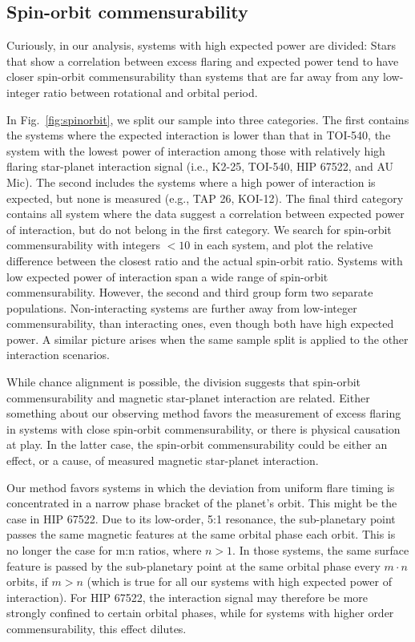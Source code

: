 \documentclass[twocolumn]{aastex631}
\begin{document}
\subsection{Spin-orbit commensurability}
\label{sec:discussion:commensurability}
Curiously, in our analysis, systems with high expected power are divided: Stars that show a correlation between excess flaring and expected power tend to have closer spin-orbit commensurability than systems that are far away from any low-integer ratio between rotational and orbital period.

In Fig.~\ref{fig:spinorbit}, we split our sample into three categories. The first contains the systems where the expected interaction is lower than that in TOI-540, the system with the lowest power of interaction among those with relatively high flaring star-planet interaction signal (i.e., K2-25, TOI-540, HIP 67522, and AU Mic). The second includes the systems where a high power of interaction is expected, but none is measured (e.g., TAP 26, KOI-12). The final third category contains all system where the data suggest a correlation between expected power of interaction, but do not belong in the first category. We search for spin-orbit commensurability with integers $<10$ in each system, and plot the relative difference between the closest ratio and the actual spin-orbit ratio. Systems with low expected power of interaction span a wide range of spin-orbit commensurability. However, the second and third group form two separate populations. Non-interacting systems are further away from low-integer commensurability, than interacting ones, even though both have high expected power. A similar picture arises when the same sample split is applied to the other interaction scenarios. 

While chance alignment is possible, the division suggests that spin-orbit commensurability and magnetic star-planet interaction are related. Either something about our observing method favors the measurement of excess flaring in systems with close spin-orbit commensurability, or there is physical causation at play. In the latter case, the spin-orbit commensurability could be either an effect, or a cause, of measured magnetic star-planet interaction. 

Our method favors systems in which the deviation from uniform flare timing is concentrated in a narrow phase bracket of the planet's orbit. This might be the case in HIP 67522. Due to its low-order, 5:1 resonance, the sub-planetary point passes the same magnetic features at the same orbital phase each orbit. This is no longer the case for m:n ratios, where $n>1$. In those systems, the same surface feature is passed by the sub-planetary point at the same orbital phase every $m \cdot n$ orbits, if $m>n$ (which is true for all our systems with high expected power of interaction). For HIP 67522, the interaction signal may therefore be more strongly confined to certain orbital phases, while for systems with higher order commensurability, this effect dilutes. 
\end{document}
